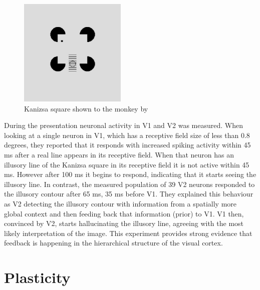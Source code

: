 \begin{figure}
  \includegraphics[width=\linewidth]{figures/kanizsaSquare.PNG}
  \caption{Kanizsa square shown to the monkey by \citet{HierachicalBayesVisualCortex}}
  \label{fig:KanizsaSquare}
\end{figure}
During the presentation neuronal activity in V1 and V2 was measured. When looking at a single neuron in V1, which has a receptive field size of less than 0.8 degrees, they reported that it responds with increased spiking activity within 45 ms after a real line appears in its receptive field. When that neuron has an illusory line of the Kanizsa square in its receptive field it is not active within 45 ms. However after 100 ms it begins to respond, indicating that it starts seeing the illusory line. In contrast, the measured population of 39 V2 neurons responded to the illusory contour after 65 ms, 35 ms before V1. They explained this behaviour as V2 detecting the illusory contour with information from a spatially more global context and then feeding back that information (prior) to V1. V1 then, convinced by V2, starts hallucinating the illusory line, agreeing with the most likely interpretation of the image. This experiment provides strong evidence that feedback is happening in the hierarchical structure of the visual cortex.

\section{Plasticity}

